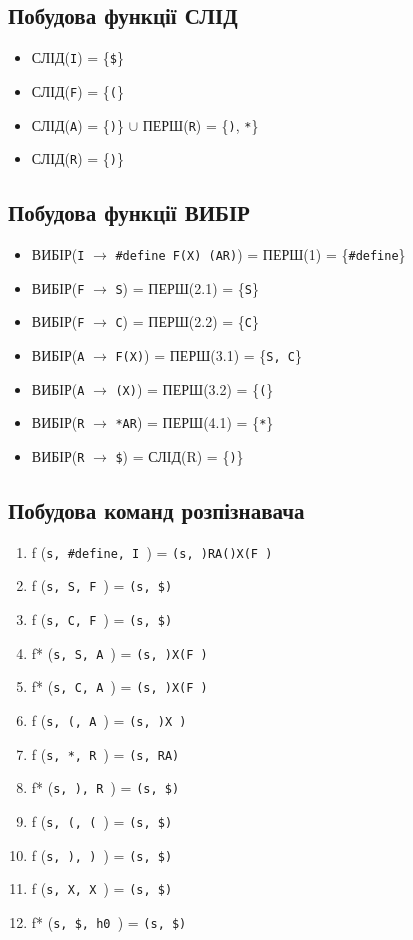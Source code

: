 \subsection{Побудова функції СЛІД}
\begin{itemize}
    \item  СЛІД(\verb|I|) = \{\verb|$|\}
    \item  СЛІД(\verb|F|) = \{\verb|(|\}
    \item  СЛІД(\verb|A|) = \{\verb|)|\} $\cup$ ПЕРШ(\verb|R|) = \{\verb|)|, \verb|*|\}
    \item  СЛІД(\verb|R|) = \{\verb|)|\}

\end{itemize}

\subsection{Побудова функції ВИБІР}
\begin{itemize}
    \item  ВИБІР(\verb|I| $\to$ \verb|#define F(X) (AR)|) = ПЕРШ(1) = \{\verb|#define|\}
    \item  ВИБІР(\verb|F| $\to$ \verb|S|) = ПЕРШ(2.1) = \{\verb|S|\}
    \item  ВИБІР(\verb|F| $\to$ \verb|C|) = ПЕРШ(2.2) = \{\verb|C|\}
    \item  ВИБІР(\verb|A| $\to$ \verb|F(X)|) = ПЕРШ(3.1) = \{\verb|S, C|\}
    \item  ВИБІР(\verb|A| $\to$ \verb|(X)|) = ПЕРШ(3.2) = \{\verb|(|\}
    \item  ВИБІР(\verb|R| $\to$ \verb|*AR|) = ПЕРШ(4.1) = \{\verb|*|\}
    \item  ВИБІР(\verb|R| $\to$ \verb|$|) = СЛІД(R) = \{\verb|)|\}
\end{itemize}


\newpage
\subsection{Побудова команд розпізнавача}
\begin{enumerate}
    \item  f (\verb|s, #define, I |) = \verb|(s, )RA()X(F )|\
    \item  f (\verb|s, S, F |) = \verb|(s, $)|\
    \item  f (\verb|s, C, F |) = \verb|(s, $)|\
    \item  f* (\verb|s, S, A |) = \verb|(s, )X(F )|\
    \item  f* (\verb|s, C, A |) = \verb|(s, )X(F )|\
    \item  f (\verb|s, (, A |) = \verb|(s, )X )|\
    \item  f (\verb|s, *, R |) = \verb|(s, RA)|\
    \item  f* (\verb|s, ), R |) = \verb|(s, $)|\
    \item  f (\verb|s, (, ( |) = \verb|(s, $)|\
    \item  f (\verb|s, ), ) |) = \verb|(s, $)|\
    \item  f (\verb|s, X, X |) = \verb|(s, $)|\
    \item  f* (\verb|s, $, h0 |) = \verb|(s, $)|\
\end{enumerate}

